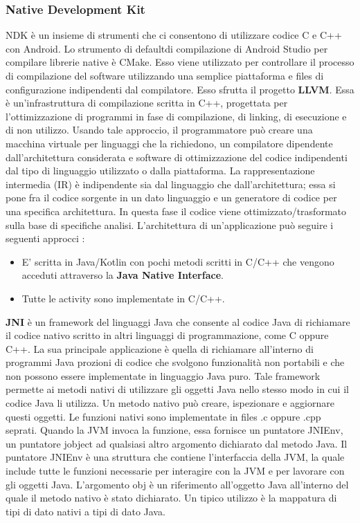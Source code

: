 \documentclass[12pt]{report}
\begin{document}
\subsubsection{Native Development Kit}
NDK è un insieme di strumenti che ci consentono di utilizzare codice C e C++ con Android. Lo strumento di defaultdi compilazione di Android Studio per compilare librerie native è CMake. Esso viene utilizzato per controllare il processo di compilazione del software utilizzando una semplice piattaforma e files di configurazione indipendenti dal compilatore. Esso sfrutta il progetto \textbf{LLVM}. Essa è un'infrastruttura di compilazione scritta in C++, progettata per l'ottimizzazione di programmi in fase di compilazione, di linking, di esecuzione e di non utilizzo. Usando tale approccio, il programmatore può creare una macchina virtuale per linguaggi che la richiedono, un compilatore dipendente dall'architettura considerata e software di ottimizzazione del codice indipendenti dal tipo di linguaggio utilizzato o dalla piattaforma. La rappresentazione intermedia (IR) è indipendente sia dal linguaggio che dall'architettura; essa si pone fra il codice sorgente in un dato linguaggio e un generatore di codice per una specifica architettura. In questa fase il codice viene ottimizzato/trasformato sulla base di specifiche analisi. L'architettura di un'applicazione può seguire i seguenti approcci :
\begin{itemize}
\item E' scritta in Java/Kotlin con pochi metodi scritti in C/C++ che vengono acceduti attraverso la \textbf{Java Native Interface}.
\item Tutte le activity sono implementate in C/C++.
\end{itemize}
\textbf{JNI} è un framework del linguaggi Java che consente al codice Java di richiamare il codice nativo scritto in altri linguaggi di programmazione, come C oppure C++. La sua principale applicazione è quella di richiamare all'interno di programmi Java prozioni di codice che svolgono funzionalità non portabili e che non possono essere implementate in linguaggio Java puro. Tale framework permette ai metodi nativi di utilizzare gli oggetti Java nello stesso modo in cui il codice Java li utilizza. Un metodo nativo può creare, ispezionare e aggiornare questi oggetti. Le funzioni nativi sono implementate in files .c oppure .cpp seprati. Quando la JVM invoca la funzione, essa fornisce un puntatore JNIEnv, un puntatore jobject ad qualsiasi altro argomento dichiarato dal metodo Java. Il puntatore JNIEnv è una struttura che contiene l'interfaccia della JVM, la quale include tutte le funzioni necessarie per interagire con la JVM e per lavorare con gli oggetti Java. L'argomento obj è un riferimento all'oggetto Java all'interno del quale il metodo nativo è stato dichiarato. Un tipico utilizzo è la mappatura di tipi di dato nativi a tipi di dato Java.
\end{document}

